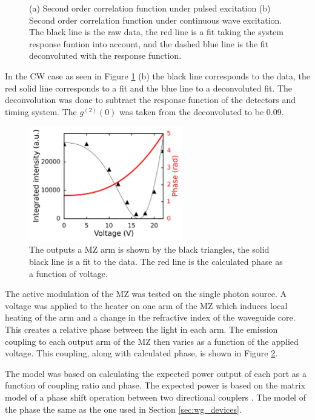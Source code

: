 \begin{figure}[h!]
\begin{subfigure}{0.49\textwidth}
\end{subfigure} \caption{(a) Second order correlation function under pulsed
excitation (b) Second order correlation function under continuous wave
excitation. The black line is the raw data, the red line is a fit taking the
system response funtion into account, and the dashed blue line is the fit
deconvoluted with the response function.} \label{fig:g2s} \end{figure}

In the CW case as seen in Figure \ref{fig:g2s} (b) the black line corresponds to
the data, the red solid line corresponds to a fit and the blue line to a
deconvoluted fit. The deconvolution was done to subtract the response function
of the detectors and timing system. The $g^{(2)}(0)$ was taken from the
deconvoluted to be 0.09.

\begin{figure}[h!] \centering
\includegraphics[width=0.6\textwidth]{images/dj_oneport.png} \caption{The
outputs a MZ arm is shown by the black triangles, the solid black line is a fit
to the data. The red line is the calculated phase as a function of voltage.}
\label{fig:modul} \end{figure}

The active modulation of the MZ was tested on the single photon source. A
voltage was applied to the heater on one arm of the MZ which induces local
heating of the arm and a change in the refractive index of the waveguide core.
This creates a relative phase between the light in each arm. The emission
coupling to each output arm of the MZ then varies as a function of the applied
voltage. This coupling, along with calculated phase, is shown in Figure
\ref{fig:modul}.

The model was based on calculating the expected power output of each port as a
function of coupling ratio and phase. The expected power is based on the matrix
model of a phase shift operation between two directional couplers
\cite{jones1941new}. The model of the phase the same as the one used in Section
\ref{sec:wg_devices}\cite{matthews2009manipulation}.

